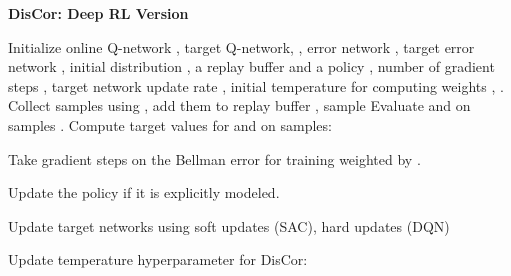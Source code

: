 \documentclass[jmlr]{article}
\begin{document}
\begin{algorithm}[t!]
\small
\caption{\textbf{DisCor: Deep RL Version}}
\label{alg:practical_alg}
\begin{algorithmic}[1]
    \STATE Initialize online Q-network , target Q-network, , error network , target error network , initial distribution , a replay buffer  and a policy , number of gradient steps , target network update rate , initial temperature for computing weights , .
        \STATE Collect  samples using , add them to replay buffer , sample 
        \STATE Evaluate  and  on samples .
        \STATE Compute target values for  and  on samples:
        
        
        \STATE Take  gradient steps on the Bellman error for training  weighted by .
        
        \STATE Update the policy  if it is explicitly modeled.
         
        \STATE Update target networks using soft updates (SAC), hard updates (DQN)
            
           
        \STATE Update temperature hyperparameter for DisCor:
        
    \ENDFOR
\end{algorithmic}
\end{algorithm}
\end{document}

